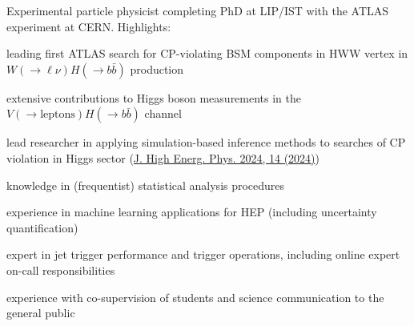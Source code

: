 
Experimental particle physicist completing PhD at LIP/IST with the ATLAS experiment at CERN. Highlights:

\begin{cvitems}
    \item[]\vspace{-0.5\baselineskip}
    \item leading first ATLAS search for CP-violating BSM components in HWW vertex in $W(\to \ell \nu) H(\to b\bar{b})$ production
    \item extensive contributions to Higgs boson measurements in the $V(\to \textrm{leptons}) H(\to b\bar{b})$ channel
    \item lead researcher in applying simulation-based inference methods to searches of CP violation in Higgs sector (\href{https://doi.org/10.1007/JHEP04(2024)014}{J. High Energ. Phys. 2024, 14 (2024)})
    \item knowledge in (frequentist) statistical analysis procedures
    \item experience in machine learning applications for HEP (including uncertainty quantification)
    \item expert in jet trigger performance and trigger operations, including online expert on-call responsibilities
    \item experience with co-supervision of students and science communication to the general public
    \item[]\vspace{-0.5\baselineskip}
\end{cvitems}
